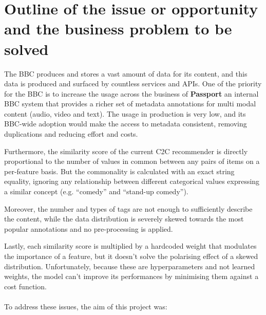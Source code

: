 
\section{Outline of the issue or opportunity and the business problem to be solved}

The BBC produces and stores a vast amount of data for its content, and this data is produced and surfaced by countless services and APIs.
One of the priority for the BBC is to increase the usage across the business of \textbf{Passport} \cite{BBC:PassportMetadata} an internal BBC
system that provides a richer set of metadata annotations for multi modal content (audio, video and text).
The usage in production is very low, and its BBC-wide adoption would make the access to metadata consistent,
removing duplications and reducing effort and costs.

Furthermore, the similarity score of the current C2C recommender is directly proportional to the number of values in common between any pairs of items
on a per-feature basis. But the commonality is calculated with an exact string equality, ignoring any relationship between different
categorical values expressing a similar concept (e.g. ``comedy'' and ``stand-up comedy'').

Moreover, the number and types of tags are not enough to sufficiently
describe the content, while the data distribution is severely skewed towards the most popular annotations and no pre-processing
is applied.

Lastly, each similarity score is multiplied by a hardcoded weight that modulates the importance of a feature, but it doesn't solve
the polarising effect of a skewed distribution. Unfortunately, because these are hyperparameters and not learned weights, the model can't improve
its performances by minimising them against a cost function.
\\ \\
To address these issues, the aim of this project was:

